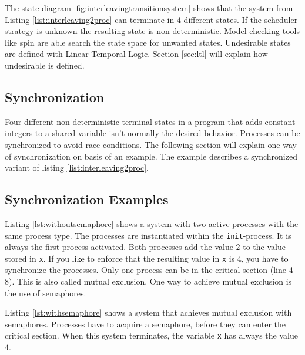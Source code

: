\documentclass[12pt,a4paper,twoside]{article}
\begin{document}
The state diagram \ref{fig:interleavingtransitionsystem} shows that the system from Listing \ref{list:interleaving2proc} can terminate in 4 different states. If the scheduler strategy is unknown the resulting state is non-deterministic. Model checking tools like spin are able search the state space for unwanted states. Undesirable states are defined with Linear Temporal Logic. Section \ref{sec:ltl} will explain how undesirable is defined.

\subsection{Synchronization}
\label{sec:synchronization}

Four different non-deterministic terminal states in a program that adds constant integers to a shared variable isn't normally the desired behavior. Processes can be synchronized to avoid race conditions. The following section will explain one way of synchronization on basis of an example. The example describes a synchronized variant of listing \ref{list:interleaving2proc}.

\subsection{Synchronization Examples}
\label{sec:syncexample}

Listing \ref{lst:withoutsemaphore} shows a system with two active processes with the same process type. The processes are instantiated within the \verb|init|-process. It is always the first process activated. Both processes add the value $2$ to the value stored in \verb|x|. If you like to enforce that the resulting value in \verb|x| is $4$, you have to synchronize the processes. Only one process can be in the critical section (line 4-8). This is also called mutual exclusion. One way to achieve mutual exclusion is the use of semaphores.



Listing \ref{lst:withsemaphore} shows a system that achieves mutual exclusion with semaphores. Processes have to acquire a semaphore, before they can enter the critical section. When this system terminates, the variable \verb|x| has always the value $4$.


\end{document}

